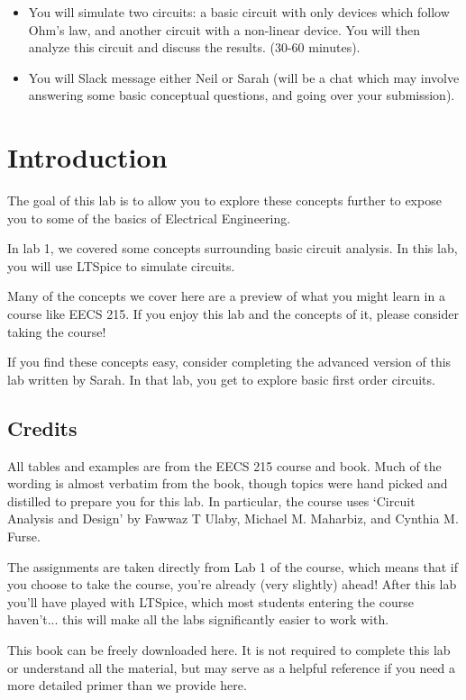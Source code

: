 \documentclass{article}
\begin{document}
\begin{itemize}
  \item You will simulate two circuits: a basic circuit with only devices which follow Ohm's law, and another circuit with a non-linear device. You will then analyze this circuit and discuss the results. (30-60 minutes).
  \item You will Slack message either Neil or Sarah (will be a chat which may involve answering some basic conceptual questions, and going over your submission).
\end{itemize}

\section{Introduction}
The goal of this lab is to allow you to explore these concepts further to expose you to some of the basics of Electrical Engineering.

In lab 1, we covered some concepts surrounding basic circuit analysis. In this lab, you will use LTSpice to simulate circuits.

Many of the concepts we cover here are a preview of what you might learn in a course like EECS 215. If you enjoy this lab and the concepts of it, please consider taking the course!

If you find these concepts easy, consider completing the advanced version of this lab written by Sarah. In that lab, you get to explore basic first order circuits.

\subsection{Credits}
All tables and examples are from the EECS 215 course and book. Much of the wording is almost verbatim from the book, though topics were hand picked and distilled to prepare you for this lab. In particular, the course uses `Circuit Analysis and Design' by Fawwaz T Ulaby, Michael M. Maharbiz, and Cynthia M. Furse.

The assignments are taken directly from Lab 1 of the course, which means that if you choose to take the course, you're already (very slightly) ahead! After this lab you'll have played with LTSpice, which most students entering the course haven't... this will make all the labs significantly easier to work with.

This book can be freely downloaded here. It is not required to complete this lab or understand all the material, but may serve as a helpful reference if you need a more detailed primer than we provide here.
\end{document}
